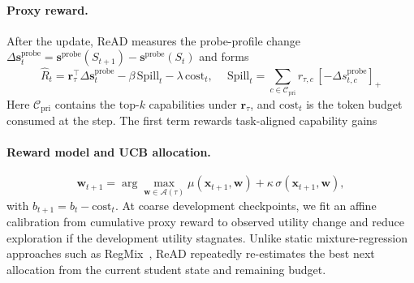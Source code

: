 \paragraph{Proxy reward.}
After the update, ReAD measures the probe-profile change
$\Delta\mathbf{s}^{\mathrm{probe}}_t=\mathbf{s}^{\mathrm{probe}}(S_{t+1})-\mathbf{s}^{\mathrm{probe}}(S_t)$ and forms
\begin{equation}
\widehat{R}_t
=\mathbf{r}_\tau^\top\Delta\mathbf{s}^{\mathrm{probe}}_t
-\beta\,\mathrm{Spill}_t
-\lambda\,\mathrm{cost}_t, \quad\ \mathrm{Spill}_t=
\sum_{c\in\mathcal{C}_{\mathrm{pri}}}
 r_{\tau,c}\,[-\Delta s^{\mathrm{probe}}_{t,c}]_+
\label{eq:reward}
\end{equation}
Here $\mathcal{C}_{\mathrm{pri}}$ contains the top-$k$  capabilities under $\mathbf{r}_\tau$, and $\mathrm{cost}_t$ is the token budget consumed at the step. The first term rewards task-aligned capability gains

\paragraph{Reward model and UCB allocation.}
\begin{equation}
\mathbf{w}_{t+1}
=\arg\max_{\mathbf{w}\in\mathcal{A}(\tau)}
\mu(\mathbf{x}_{t+1},\mathbf{w})+\kappa\,\sigma(\mathbf{x}_{t+1},\mathbf{w}),
\label{eq:ucb}
\end{equation}
with $b_{t+1}=b_t-\mathrm{cost}_t$. At coarse development checkpoints, we fit an affine calibration from cumulative proxy reward to observed utility change and reduce exploration if the development utility stagnates. Unlike static mixture-regression approaches such as RegMix~\citep{liu2024regmix}, ReAD repeatedly re-estimates the best next allocation from the current student state and remaining budget.
